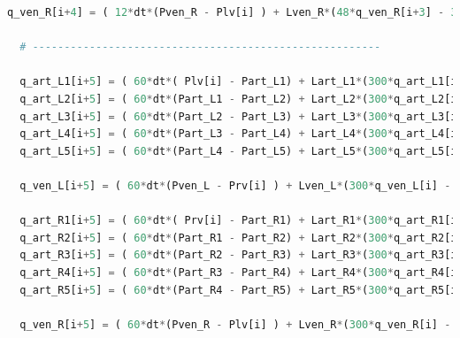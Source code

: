 \begin{lstlisting}[language=Python,caption={Математическая модель сердечно-сосудистой системы на языке программирования Python},label={list:cardiovascular_system_model}]
  q_ven_R[i+4] = ( 12*dt*(Pven_R - Plv[i] ) + Lven_R*(48*q_ven_R[i+3] - 36*q_ven_R[i+2] + 16*q_ven_R[i+1] - 3*q_ven_R[i]) ) / (25*Lven_R + 12*dt*(Rven_R + Rmv)) 

  # -------------------------------------------------------
  
  q_art_L1[i+5] = ( 60*dt*( Plv[i] - Part_L1) + Lart_L1*(300*q_art_L1[i] - 300*q_art_L1[i-1] + 200*q_art_L1[i-2] - 75*q_art_L1[i-3] + 12*q_art_L1[i-4]) ) / (137*Lart_L1 + 60*dt*(Rart_L1 + Rav)) 
  q_art_L2[i+5] = ( 60*dt*(Part_L1 - Part_L2) + Lart_L2*(300*q_art_L2[i] - 300*q_art_L2[i-1] + 200*q_art_L2[i-2] - 75*q_art_L2[i-3] + 12*q_art_L2[i-4]) ) / (137*Lart_L2 + 60*dt*Rart_L2)
  q_art_L3[i+5] = ( 60*dt*(Part_L2 - Part_L3) + Lart_L3*(300*q_art_L3[i] - 300*q_art_L3[i-1] + 200*q_art_L3[i-2] - 75*q_art_L3[i-3] + 12*q_art_L3[i-4]) ) / (137*Lart_L3 + 60*dt*Rart_L3)
  q_art_L4[i+5] = ( 60*dt*(Part_L3 - Part_L4) + Lart_L4*(300*q_art_L4[i] - 300*q_art_L4[i-1] + 200*q_art_L4[i-2] - 75*q_art_L4[i-3] + 12*q_art_L4[i-4]) ) / (137*Lart_L4 + 60*dt*Rart_L4)
  q_art_L5[i+5] = ( 60*dt*(Part_L4 - Part_L5) + Lart_L5*(300*q_art_L5[i] - 300*q_art_L5[i-1] + 200*q_art_L5[i-2] - 75*q_art_L5[i-3] + 12*q_art_L5[i-4]) ) / (137*Lart_L5 + 60*dt*Rart_L5)
      
  q_ven_L[i+5] = ( 60*dt*(Pven_L - Prv[i] ) + Lven_L*(300*q_ven_L[i] - 300*q_ven_L[i-1] + 200*q_ven_L[i-2] - 75*q_ven_L[i-3] + 12*q_ven_L[i-4]) ) / (137*Lven_L + 60*dt*(Rven_L + Rtr)) 

  q_art_R1[i+5] = ( 60*dt*( Prv[i] - Part_R1) + Lart_R1*(300*q_art_R1[i] - 300*q_art_R1[i-1] + 200*q_art_R1[i-2] - 75*q_art_R1[i-3] + 12*q_art_R1[i-4]) ) / (137*Lart_R1 + 60*dt*(Rart_R1 + Rpv)) 
  q_art_R2[i+5] = ( 60*dt*(Part_R1 - Part_R2) + Lart_R2*(300*q_art_R2[i] - 300*q_art_R2[i-1] + 200*q_art_R2[i-2] - 75*q_art_R2[i-3] + 12*q_art_R2[i-4]) ) / (137*Lart_R2 + 60*dt*Rart_R2)
  q_art_R3[i+5] = ( 60*dt*(Part_R2 - Part_R3) + Lart_R3*(300*q_art_R3[i] - 300*q_art_R3[i-1] + 200*q_art_R3[i-2] - 75*q_art_R3[i-3] + 12*q_art_R3[i-4]) ) / (137*Lart_R3 + 60*dt*Rart_R3)
  q_art_R4[i+5] = ( 60*dt*(Part_R3 - Part_R4) + Lart_R4*(300*q_art_R4[i] - 300*q_art_R4[i-1] + 200*q_art_R4[i-2] - 75*q_art_R4[i-3] + 12*q_art_R4[i-4]) ) / (137*Lart_R4 + 60*dt*Rart_R4)
  q_art_R5[i+5] = ( 60*dt*(Part_R4 - Part_R5) + Lart_R5*(300*q_art_R5[i] - 300*q_art_R5[i-1] + 200*q_art_R5[i-2] - 75*q_art_R5[i-3] + 12*q_art_R5[i-4]) ) / (137*Lart_R5 + 60*dt*Rart_R5)

  q_ven_R[i+5] = ( 60*dt*(Pven_R - Plv[i] ) + Lven_R*(300*q_ven_R[i] - 300*q_ven_R[i-1] + 200*q_ven_R[i-2] - 75*q_ven_R[i-3] + 12*q_ven_R[i-4]) ) / (137*Lven_R + 60*dt*(Rven_R + Rmv)) 
  

\end{lstlisting}
